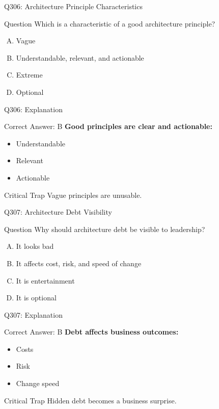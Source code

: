 \documentclass{beamer}
\begin{document}
	\begin{frame}{Q306: Architecture Principle Characteristics}
		\begin{block}{Question}
			Which is a characteristic of a good architecture principle?
		\end{block}
		\begin{enumerate}[(A)]
			\item Vague
			\item Understandable, relevant, and actionable
			\item Extreme
			\item Optional
		\end{enumerate}
	\end{frame}
	
	\begin{frame}{Q306: Explanation}
		\begin{block}{Correct Answer: B}
			\textbf{Good principles are clear and actionable:}
			\begin{itemize}
				\item Understandable
				\item Relevant
				\item Actionable
			\end{itemize}
		\end{block}
		\begin{alertblock}{Critical Trap}
			Vague principles are unusable.
		\end{alertblock}
	\end{frame}
	
	\begin{frame}{Q307: Architecture Debt Visibility}
		\begin{block}{Question}
			Why should architecture debt be visible to leadership?
		\end{block}
		\begin{enumerate}[(A)]
			\item It looks bad
			\item It affects cost, risk, and speed of change
			\item It is entertainment
			\item It is optional
		\end{enumerate}
	\end{frame}
	
	\begin{frame}{Q307: Explanation}
		\begin{block}{Correct Answer: B}
			\textbf{Debt affects business outcomes:}
			\begin{itemize}
				\item Costs
				\item Risk
				\item Change speed
			\end{itemize}
		\end{block}
		\begin{alertblock}{Critical Trap}
			Hidden debt becomes a business surprise.
		\end{alertblock}
	\end{frame}
	
\end{document}
